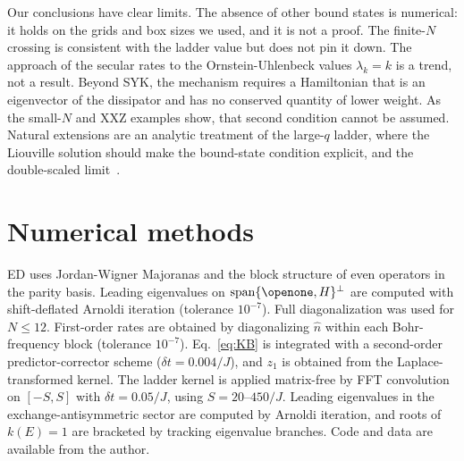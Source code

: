 \documentclass[aps,pre,twocolumn,superscriptaddress,amsmath,amssymb,10pt]{revtex4-2}
\begin{document}
Our conclusions have clear limits. The absence of other bound states is numerical: it holds on the grids and box sizes we used, and it is not a proof. The finite-$N$ crossing is consistent with the ladder value but does not pin it down. The approach of the secular rates to the Ornstein-Uhlenbeck values $\lambda_k=k$ is a trend, not a result. Beyond SYK, the mechanism requires a Hamiltonian that is an eigenvector of the dissipator and has no conserved quantity of lower weight. As the small-$N$ and XXZ examples show, that second condition cannot be assumed. Natural extensions are an analytic treatment of the large-$q$ ladder, where the Liouville solution should make the bound-state condition explicit, and the double-scaled limit~\cite{Berkooz2019,Lin2022}.

\section*{Numerical methods}

ED uses Jordan-Wigner Majoranas and the block structure of even operators in the parity basis. Leading eigenvalues on $\mathrm{span}\{\openone,H\}^\perp$ are computed with shift-deflated Arnoldi iteration (tolerance $10^{-7}$). Full diagonalization was used for $N\le12$. First-order rates are obtained by diagonalizing $\hat n$ within each Bohr-frequency block (tolerance $10^{-7}$). Eq.~\eqref{eq:KB} is integrated with a second-order predictor-corrector scheme ($\delta t=0.004/J$), and $z_1$ is obtained from the Laplace-transformed kernel. The ladder kernel is applied matrix-free by FFT convolution on $[-S,S]$ with $\delta t=0.05/J$, using $S=20$--$450/J$. Leading eigenvalues in the exchange-antisymmetric sector are computed by Arnoldi iteration, and roots of $k(E)=1$ are bracketed by tracking eigenvalue branches. Code and data are available from the author.
\end{document}
